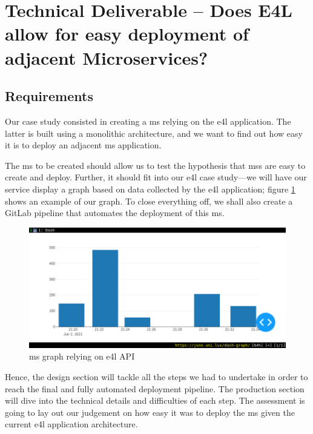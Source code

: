 \section{Technical Deliverable -- Does E4L allow for easy
deployment of adjacent Microservices?}
\label{td:ms}

\subsection{Requirements}

Our case study consisted in creating a \gls{ms} relying on the
\gls{e4l} application. The latter is built using a monolithic
architecture, and we want to find out how easy it is to deploy an
adjacent \gls{ms} application.

The \gls{ms} to be created should allow us to test the hypothesis that
\glspl{ms} are easy to create and deploy. Further, it should fit into
our \gls{e4l} case study---we will have our service display a graph
based on data collected by the \gls{e4l} application; figure
\ref{fig:dash-api} shows an example of our graph.  To close
everything off, we shall also create a GitLab pipeline that automates
the deployment of this \gls{ms}.

\begin{figure}
	\centering
	\includegraphics[width=\linewidth]{images/dash-API-demo.png}
	\caption{\gls{ms} graph relying on \gls{e4l} API}
	\label{fig:dash-api}
\end{figure}

Hence, the design section will tackle all the steps we had to
undertake in order to reach the final and fully automated deployment
pipeline. The production section will dive into the technical details
and difficulties of each step. The assessment is going to lay out our
judgement on how easy it was to deploy the \gls{ms} given the current
\gls{e4l} application architecture.

